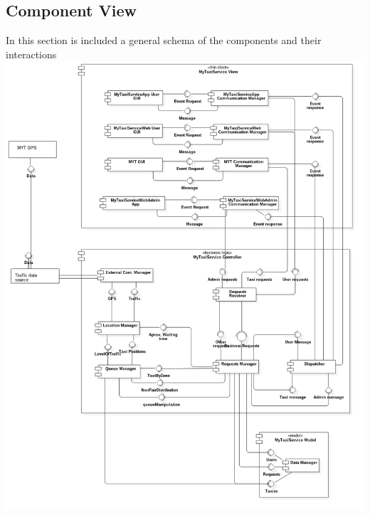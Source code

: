 \documentclass[11pt,titlepage]{article} %
\newenvironment{changemargin}[3]{%
\begin{list}{}{%
\setlength{\topsep}{0pt}%
\setlength{\headsep}{#3}%
\setlength{\leftmargin}{#1}%
\setlength{\rightmargin}{#2}%
\setlength{\listparindent}{\parindent}%
\setlength{\itemindent}{\parindent}%
\setlength{\parsep}{\parskip}%
}%
\item[]}{\end{list}}
\begin{document}
\begin{changemargin}{-1.5cm}{0cm}{0pt}
\subsection{Component View}
In this section is included a general schema of the components and their interactions\newline
	\includegraphics[scale=0.42]{component.png}
\end{changemargin}
\newpage
\end{document}
